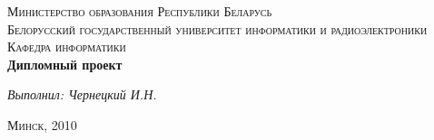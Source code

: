 \begin{titlepage}
  \begin{center}
    \textsc{\Large Министерство образования Республики Беларусь}\\[1cm]
    \textsc{\LARGE Белорусский государственный университет информатики и радиоэлектроники}\\[1.5cm]
    \textsc{\Large Кафедра информатики}\\[4cm]
    \textbf{\Huge Дипломный проект}\\[3cm]
    \begin{minipage}{\textwidth}
      \begin{flushright}
        \textit{\Large Выполнил: Чернецкий И.Н.}
      \end{flushright}
    \end{minipage}
    \vfill
    \textsc{\Large Минск, 2010}
  \end{center}
\end{titlepage}
